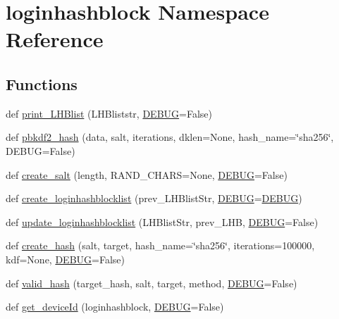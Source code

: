 \hypertarget{namespaceloginhashblock}{}\section{loginhashblock Namespace Reference}
\label{namespaceloginhashblock}
\subsection*{Functions}
\begin{DoxyCompactItemize}
\item 
def \hyperlink{namespaceloginhashblock_af47615d0e87d554eae9e6d49131fe49c}{print\+\_\+\+L\+H\+Blist} (L\+H\+Bliststr, \hyperlink{namespaceloginhashblock_ad198a2ffc3d7bab32167aed00d2f5c65}{D\+E\+B\+UG}=False)
\item 
def \hyperlink{namespaceloginhashblock_a104d0a92cdfb6c337794b6ded42667d4}{pbkdf2\+\_\+hash} (data, salt, iterations, dklen=None, hash\+\_\+name=\char`\"{}sha256\char`\"{}, D\+E\+B\+UG=False)
\item 
def \hyperlink{namespaceloginhashblock_afe116dea3aaff238a5fa2bcd6edf2281}{create\+\_\+salt} (length, R\+A\+N\+D\+\_\+\+C\+H\+A\+RS=None, \hyperlink{namespaceloginhashblock_ad198a2ffc3d7bab32167aed00d2f5c65}{D\+E\+B\+UG}=False)
\item 
def \hyperlink{namespaceloginhashblock_ab3608ba58ffedb0bd8bba86ce71fdefe}{create\+\_\+loginhashblocklist} (prev\+\_\+\+L\+H\+Blist\+Str, \hyperlink{namespaceloginhashblock_ad198a2ffc3d7bab32167aed00d2f5c65}{D\+E\+B\+UG}=\hyperlink{namespaceloginhashblock_ad198a2ffc3d7bab32167aed00d2f5c65}{D\+E\+B\+UG})
\item 
def \hyperlink{namespaceloginhashblock_a7baa4021b9f57044f8227c2e0320ee2b}{update\+\_\+loginhashblocklist} (L\+H\+Blist\+Str, prev\+\_\+\+L\+HB, \hyperlink{namespaceloginhashblock_ad198a2ffc3d7bab32167aed00d2f5c65}{D\+E\+B\+UG}=False)
\item 
def \hyperlink{namespaceloginhashblock_a935d8ae1c51e50f9e5db6a1d5f02b1b8}{create\+\_\+hash} (salt, target, hash\+\_\+name=\char`\"{}sha256\char`\"{}, iterations=100000, kdf=None, \hyperlink{namespaceloginhashblock_ad198a2ffc3d7bab32167aed00d2f5c65}{D\+E\+B\+UG}=False)
\item 
def \hyperlink{namespaceloginhashblock_ac7faa165bc305e611390727f11946424}{valid\+\_\+hash} (target\+\_\+hash, salt, target, method, \hyperlink{namespaceloginhashblock_ad198a2ffc3d7bab32167aed00d2f5c65}{D\+E\+B\+UG}=False)
\item 
def \hyperlink{namespaceloginhashblock_a1908d7c90a7ea1a7f84eeac3a1378b57}{get\+\_\+device\+Id} (loginhashblock, \hyperlink{namespaceloginhashblock_ad198a2ffc3d7bab32167aed00d2f5c65}{D\+E\+B\+UG}=False)

\end{DoxyCompactItemize}
